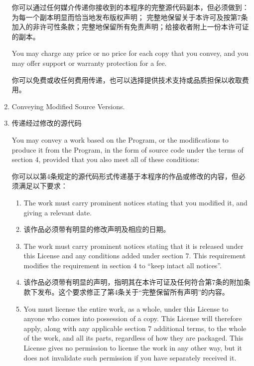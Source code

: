 \documentclass[11pt]{article}
\begin{document}
\begin{enumerate}
        你可以通过任何媒介传递你接收到的本程序的完整源代码副本，但必须做到：为每一个副本明显而恰当地发布版权声明；
        完整地保留关于本许可及按第7条加入的非许可性条款；完整地保留所有免责声明；给接收者附上一份本许可证的副本。


        You may charge any price or no price for each copy that you convey,
        and you may offer support or warranty protection for a fee.

        你可以免费或收任何费用传递，也可以选择提供技术支持或品质担保以收取费用。

  \item Conveying Modified Source Versions.
  \item 传递经过修改的源代码

        You may convey a work based on the Program, or the modifications to
        produce it from the Program, in the form of source code under the
        terms of section 4, provided that you also meet all of these conditions:

        你可以以第4条规定的源代码形式传递基于本程序的作品或修改的内容，但必须满足以下要求：

        \begin{enumerate}
          \item The work must carry prominent notices stating that you modified
                it, and giving a relevant date.

          \item 该作品必须带有明显的修改声明及相应的日期。

          \item The work must carry prominent notices stating that it is
                released under this License and any conditions added under section
                7.  This requirement modifies the requirement in section 4 to
                ``keep intact all notices''.

          \item 该作品必须带有明显的声明，指明其在本许可证及任何符合第7条的附加条款下发布。这个要求修正了第4条关于“完整保留所有声明”的内容。

          \item You must license the entire work, as a whole, under this
                License to anyone who comes into possession of a copy.  This
                License will therefore apply, along with any applicable section 7
                additional terms, to the whole of the work, and all its parts,
                regardless of how they are packaged.  This License gives no
                permission to license the work in any other way, but it does not
                invalidate such permission if you have separately received it.


\end{enumerate}
\end{enumerate}
\end{document}

